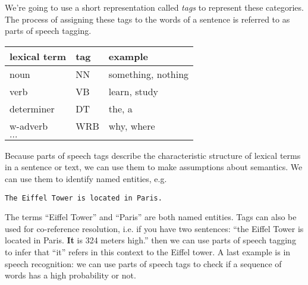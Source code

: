 \documentclass[12pt]{article}
\begin{document}
We're going to use a short representation called \emph{tags} to represent these categories. The process of assigning these tags to the words of a sentence is referred to as parts of speech tagging.

\begin{table}[h]
\begin{center}
  \begin{tabular}{l | l | l}
    \hline
    \textbf{lexical term} & \textbf{tag} & \textbf{example} \\
    \hline
    noun & NN & something, nothing \\
    verb & VB & learn, study \\
    determiner & DT & the, a \\
    w-adverb & WRB & why, where \\
    $\ldots$ & & 
  \end{tabular}
\end{center}
\end{table}

Because parts of speech tags describe the characteristic structure of lexical terms in a sentence or text, we can use them to make assumptions about semantics. We can use them to identify named entities, e.g.
\begin{verbatim}
The Eiffel Tower is located in Paris.
\end{verbatim}
The terms ``Eiffel Tower'' and ``Paris'' are both named entities. Tags can also be used for co-reference resolution, i.e. if you have two sentences: ``the Eiffel Tower is located in Paris. \textbf{It} is 324 meters high.'' then we can use parts of speech tagging to infer that ``it'' refers in this context to the Eiffel tower. A last example is in speech recognition: we can use parts of speech tags to check if a sequence of words has a high probability or not.
\end{document}
